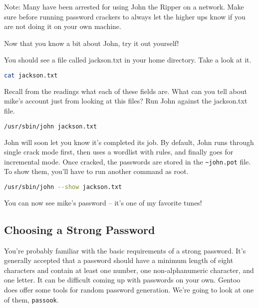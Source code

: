 \documentclass[11pt,a4paper]{article}
\begin{document}
Note: Many have been arrested for using John the Ripper on a network. Make sure before running password crackers to always let the higher ups know if you are not doing it on your own machine. 


Now that you know a bit about John, try it out yourself!

You should see a file called jackson.txt in your home directory. Take a look at it.

\begin{lstlisting}[basicstyle=\ttfamily, backgroundcolor = \color{lightgray}, language = bash, xleftmargin = 0cm, framexleftmargin = 1em]
cat jackson.txt
\end{lstlisting}

Recall from the readings what each of these fields are. What can you tell about mike's account just from looking at this files? Run John against the jackson.txt file.

\begin{lstlisting}[basicstyle=\ttfamily, backgroundcolor = \color{lightgray}, language = bash, xleftmargin = 0cm, framexleftmargin = 1em]
/usr/sbin/john jackson.txt
\end{lstlisting}

John will soon let you know it's completed its job. By default, John runs through single crack mode first, then uses a wordlist with rules, and finally goes for incremental mode. Once cracked, the passwords are stored in the \verb|~john.pot| file. To show them, you'll have to run another command as root.

\begin{lstlisting}[basicstyle=\ttfamily, backgroundcolor = \color{lightgray}, language = bash, xleftmargin = 0cm, framexleftmargin = 1em]
/usr/sbin/john --show jackson.txt
\end{lstlisting}

You can now see mike's password -- it's one of my favorite tunes!




\subsection*{Choosing a Strong Password}

\indent\indent You're probably familiar with the basic requirements of a strong password. It's generally accepted that a password should have a minimum length of eight characters and contain at least one number, one non-alphanumeric character, and one letter. It can be difficult coming up with passwords on your own. Gentoo does offer some tools for random password generation. We're going to look at one of them, \verb|passook|.
\end{document}
